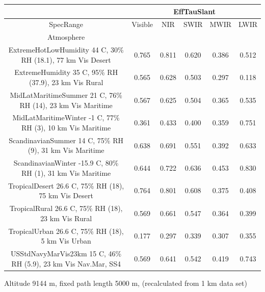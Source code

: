 \documentclass{workpackage}
\begin{document}
\begin{center}

\begin{footnotesize}

\begin{tabular}{|c|c|c|c|c|c|}
\hline
&\multicolumn{5}{|c|}{EffTauSlant}\\\hline
SpecRange&Visible&NIR&SWIR&MWIR&LWIR\\\hline
Atmosphere&&&&&\\\hline
ExtremeHotLowHumidity 44 C, 30\% RH (18.1), 77 km Vis Desert&0.765&0.811&0.620&0.386&0.512\\\hline
ExtremeHumidity 35 C, 95\% RH (37.9), 23 km Vis Rural&0.565&0.628&0.503&0.297&0.118\\\hline
MidLatMaritimeSummer 21 C, 76\% RH (14), 23 km Vis Maritime&0.567&0.625&0.504&0.365&0.535\\\hline
MidLatMaritimeWinter -1 C, 77\% RH (3), 10 km Vis Maritime&0.361&0.433&0.400&0.359&0.751\\\hline
ScandinavianSummer 14 C, 75\% RH (9), 31 km Vis Maritime&0.638&0.691&0.551&0.392&0.633\\\hline
ScandinavianWinter -15.9 C, 80\% RH (1), 31 km Vis Maritime&0.644&0.722&0.636&0.453&0.830\\\hline
TropicalDesert 26.6 C, 75\% RH (18), 75 km Vis Desert&0.764&0.801&0.608&0.375&0.408\\\hline
TropicalRural 26.6 C, 75\% RH (18), 23 km Vis Rural&0.569&0.661&0.547&0.364&0.399\\\hline
TropicalUrban 26.6 C, 75\% RH (18), 5 km Vis Urban&0.177&0.297&0.339&0.307&0.355\\\hline
USStdNavyMarVis23km 15 C, 46\% RH (5.9), 23 km Vis Nav.Mar, SS4&0.569&0.641&0.542&0.419&0.743\\\hline

\end{tabular}
\end{footnotesize}
\end{center}

Altitude 9144 m, fixed path length 5000 m, (recalculated from 1 km data set)
\end{document}

